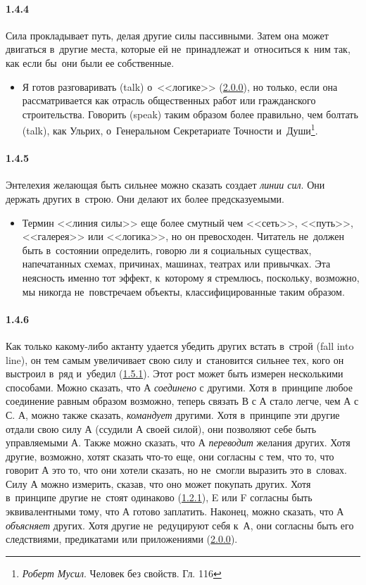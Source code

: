 \paragraph{1.4.4}\hypertarget{par:1.4.4}{} Сила прокладывает путь, делая другие силы пассивными. Затем она может двигаться в~другие места, которые ей не~принадлежат и~относиться к~ним так, как если бы~они были ее собственные.
	\begin{itemize}
	\item Я готов разговаривать (talk) о~<<логике>> (\hyperlink{par:2.0.0}{2.0.0}), но только, если она рассматривается как отрасль общественных работ или гражданского строительства. Говорить (speak) таким образом более правильно, чем болтать (talk), как Ульрих, о~Генеральном Секретариате Точности и~Души\footnote{{\itshape Роберт Мусил}. Человек без свойств. Гл. 116}.
	\end{itemize}

\paragraph{1.4.5}\hypertarget{par:1.4.5}{} Энтелехия желающая быть сильнее можно сказать создает {\itshape линии сил}. Они держать других в~строю. Они делают их более предсказуемыми. 
	\begin{itemize}
	\item Термин <<линия силы>> еще более смутный чем <<сеть>>, <<путь>>, <<галерея>> или <<логика>>, но он превосходен. Читатель не~должен быть в~состоянии определить, говорю ли я социальных существах, напечатанных схемах, причинах, машинах, театрах или привычках. Эта неясность именно тот эффект, к~которому я стремлюсь, поскольку, возможно, мы никогда не~повстречаем объекты, классифицированные таким образом.
	\end{itemize}

\paragraph{1.4.6}\hypertarget{par:1.4.6}{} Как только какому-либо актанту удается убедить других встать в~строй (fall into line), он тем самым увеличивает свою силу и~становится сильнее тех, кого он выстроил в~ряд и~убедил (\hyperlink{par:1.5.1}{1.5.1}). Этот рост может быть измерен несколькими способами. Можно сказать, что А {\itshape соединено} с другими. Хотя в~принципе любое соединение равным образом возможно, теперь связать В с А стало легче, чем А с С. А, можно также сказать, {\itshape командует} другими. Хотя в~принципе эти другие отдали свою силу А (ссудили А своей силой), они позволяют себе быть управляемыми А. Также можно сказать, что А {\itshape переводит} желания других. Хотя другие, возможно, хотят сказать что-то еще, они согласны с тем, что то, что говорит А это то, что они хотели сказать, но не~смогли выразить это в~словах. Силу А можно измерить, сказав, что оно может покупать других. Хотя в~принципе другие не~стоят одинаково (\hyperlink{par:1.2.1}{1.2.1}), E или F согласны быть эквивалентными тому, что А готово заплатить. Наконец, можно сказать, что А {\itshape объясняет} других. Хотя другие не~редуцируют себя к~А, они согласны быть его следствиями, предикатами или приложениями (\hyperlink{par:2.0.0}{2.0.0}).

